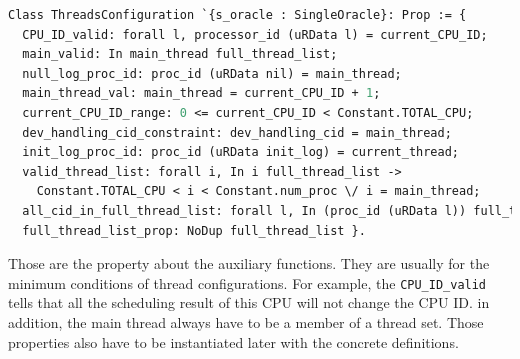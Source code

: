 \begin{lstlisting}[language=Caml]
Class ThreadsConfiguration `{s_oracle : SingleOracle}: Prop := {
  CPU_ID_valid: forall l, processor_id (uRData l) = current_CPU_ID;
  main_valid: In main_thread full_thread_list;
  null_log_proc_id: proc_id (uRData nil) = main_thread;
  main_thread_val: main_thread = current_CPU_ID + 1;
  current_CPU_ID_range: 0 <= current_CPU_ID < Constant.TOTAL_CPU;
  dev_handling_cid_constraint: dev_handling_cid = main_thread;
  init_log_proc_id: proc_id (uRData init_log) = current_thread;
  valid_thread_list: forall i, In i full_thread_list -> 
    Constant.TOTAL_CPU < i < Constant.num_proc \/ i = main_thread;
  all_cid_in_full_thread_list: forall l, In (proc_id (uRData l)) full_thread_list;
  full_thread_list_prop: NoDup full_thread_list }. 
\end{lstlisting}

Those are the property about the auxiliary functions. 
They are usually for the minimum conditions of 
thread configurations. 
For example, 
the \lstinline$CPU_ID_valid$ tells that all the scheduling result of this CPU 
will not change the CPU ID. 
in addition, 
the main thread always have to be a member of a thread set. 
Those properties also have to be instantiated later with the concrete definitions.

